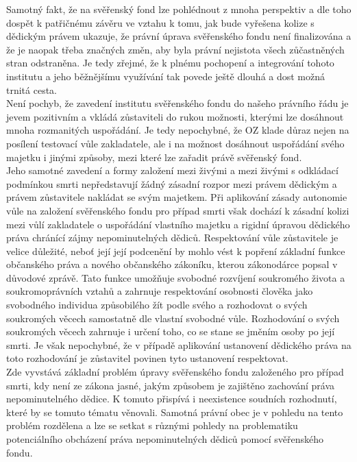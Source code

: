 \documentclass{article}
\begin{document}
Samotný fakt, že na svěřenský fond lze pohlédnout z mnoha perspektiv a dle toho dospět k patřičnému závěru ve vztahu k tomu, jak bude vyřešena kolize s dědickým právem ukazuje, že právní úprava svěřenského fondu není finalizována a že je naopak třeba značných změn, aby byla právní nejistota všech zůčastněných stran odstraněna. Je tedy zřejmé, že k plnému pochopení a integrování tohoto institutu a jeho běžnějšímu využívání tak povede ještě dlouhá a dost možná trnitá cesta.\\

Není pochyb, že zavedení institutu svěřenského fondu do našeho právního řádu je jevem pozitivním a vkládá zůstaviteli do rukou možnosti, kterými lze dosáhnout mnoha rozmanitých uspořádání. Je tedy nepochybné, že OZ klade důraz nejen na posílení testovací vůle zakladatele, ale i na možnost dosáhnout uspořádání svého majetku i jinými způsoby, mezi které lze zařadit právě svěřenský fond.\\

Jeho samotné zavedení a formy založení mezi živými a mezi živými s odkládací podmínkou smrti nepředstavují žádný zásadní rozpor mezi právem dědickým a právem zůstavitele nakládat se svým majetkem. Při aplikování zásady autonomie vůle na založení svěřenského fondu pro případ smrti však dochází k zásadní kolizi mezi vůlí zakladatele o uspořádání vlastního majetku a rigidní úpravou dědického práva chránící zájmy nepominutelných dědiců. Respektování vůle zůstavitele je velice důležité, neboť její její podcenění by mohlo vést k popření základní funkce občanského práva a nového občanského zákoníku, kterou zákonodárce popsal v důvodové zprávě. Tato funkce umožňuje svobodné rozvíjení soukromého života a soukromoprávních vztahů a zahrnuje respektování osobnosti člověka jako svobodného individua způsobilého žít podle svého a rozhodovat o svých soukromých věcech samostatně dle vlastní svobodné vůle. Rozhodování o svých soukromých věcech zahrnuje i určení toho, co se stane se jměním osoby po její smrti. Je však nepochybné, že v případě aplikování ustanovení dědického práva na toto rozhodování je zůstavitel povinen tyto ustanovení respektovat.\\

Zde vyvstává základní problém úpravy svěřenského fondu založeného pro případ smrti, kdy není ze zákona jasné, jakým způsobem je zajištěno zachování práva nepominutelného dědice. K tomuto přispívá i neexistence soudních rozhodnutí, které by se tomuto tématu věnovali. Samotná právní obec je v pohledu na tento problém rozdělena a lze se setkat s různými pohledy na problematiku potenciálního obcházení práva nepominutelných dědiců pomocí svěřenského fondu.\\
\end{document}
